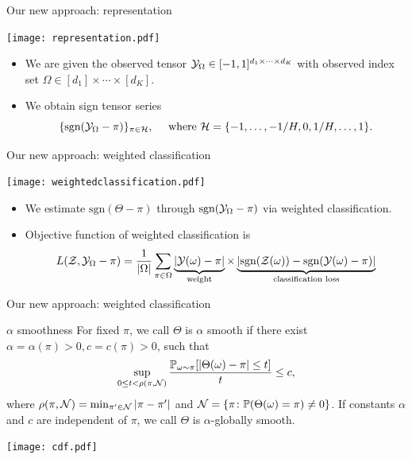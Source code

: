\documentclass[10pt, mathserif]{beamer} %
\theoremstyle{definition}
\theoremstyle{plain}
\begin{document}
\begin{frame}{Our new approach: representation}
  \begin{center}
    \texttt{[image: representation.pdf]}
    \end{center}
\begin{itemize}
    \item We are given the observed tensor $\mathcal{Y}_\Omega\in[-1,1]^{d_1\times \cdots\times d_K}$ with observed index set $\Omega\in[d_1]\times\cdots\times[d_K]$.
    \item We obtain sign tensor series \[\{\text{sgn}(\mathcal{Y}_\Omega-\pi)\}_{\pi\in\mathcal{H}},\quad \text{ where } \mathcal{H}= \{-1,\ldots,-1/H,0,1/H,\ldots,1\}.\]
\end{itemize}
    
\end{frame}
\begin{frame}{Our new approach: weighted classification}
    \begin{center}
    \texttt{[image: weightedclassification.pdf]}
    \end{center}
    \begin{itemize}
    \item We estimate $\text{sgn}(\Theta-\pi)$ through $\text{sgn}(\mathcal{Y}_\Omega-\pi)$ via weighted classification.
    \item Objective function of weighted classification is
    \begin{align}
    L(\mathcal{Z},\mathcal{Y}_\Omega-\pi) = \frac{1}{|\Omega|}\sum_{\pi\in\Omega}\underbrace{|\mathcal{Y}(\omega)-\pi|}_{\text{weight}}\times\underbrace{ |\text{sgn}(\mathcal{Z}(\omega))-\text{sgn}(\mathcal{Y}(\omega)-\pi)|}_{\text{classification loss}}
    \end{align}
    \end{itemize}
\end{frame}


\begin{frame}{Our new approach: weighted classification}
\begin{block}{$\alpha$ smoothness}
For fixed $\pi$, we call $\Theta$ is $\alpha$ smooth if there exist $\alpha = \alpha(\pi)>0,c = c(\pi)>0$, such that 
\begin{align}
    \sup_{0\leq t<\rho(\pi,\mathcal{N})}{\mathbb{P}_{\omega\sim\pi}[|\Theta(\omega)-\pi|\leq t]\over t}\leq c,
\end{align}
where $\rho(\pi,\mathcal{N}) = \min_{\pi'\in\mathcal{N}}|\pi-\pi'|$ and $\mathcal{N} = \{\pi\colon\mathbb{P}(\Theta(\omega) = \pi)\neq 0\}$.
If constants $\alpha$ and $c$ are independent of $\pi$, we call $\Theta$ is $\alpha$-globally smooth.
\end{block}
 \begin{center}
 \texttt{[image: cdf.pdf]}
 \end{center}
\end{frame}
\end{document}
